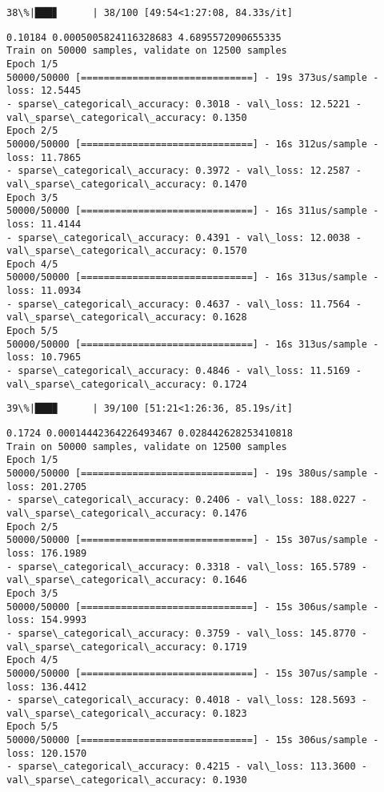 \documentclass[11pt]{article}
\begin{document}
    \begin{Verbatim}[commandchars=\\\{\}]
 38\%|███▊      | 38/100 [49:54<1:27:08, 84.33s/it]
    \end{Verbatim}

    \begin{Verbatim}[commandchars=\\\{\}]
0.10184 0.0005005824116328683 4.6895572090655335
Train on 50000 samples, validate on 12500 samples
Epoch 1/5
50000/50000 [==============================] - 19s 373us/sample - loss: 12.5445
- sparse\_categorical\_accuracy: 0.3018 - val\_loss: 12.5221 -
val\_sparse\_categorical\_accuracy: 0.1350
Epoch 2/5
50000/50000 [==============================] - 16s 312us/sample - loss: 11.7865
- sparse\_categorical\_accuracy: 0.3972 - val\_loss: 12.2587 -
val\_sparse\_categorical\_accuracy: 0.1470
Epoch 3/5
50000/50000 [==============================] - 16s 311us/sample - loss: 11.4144
- sparse\_categorical\_accuracy: 0.4391 - val\_loss: 12.0038 -
val\_sparse\_categorical\_accuracy: 0.1570
Epoch 4/5
50000/50000 [==============================] - 16s 313us/sample - loss: 11.0934
- sparse\_categorical\_accuracy: 0.4637 - val\_loss: 11.7564 -
val\_sparse\_categorical\_accuracy: 0.1628
Epoch 5/5
50000/50000 [==============================] - 16s 313us/sample - loss: 10.7965
- sparse\_categorical\_accuracy: 0.4846 - val\_loss: 11.5169 -
val\_sparse\_categorical\_accuracy: 0.1724
    \end{Verbatim}

    \begin{Verbatim}[commandchars=\\\{\}]
 39\%|███▉      | 39/100 [51:21<1:26:36, 85.19s/it]
    \end{Verbatim}

    \begin{Verbatim}[commandchars=\\\{\}]
0.1724 0.00014442364226493467 0.028442628253410818
Train on 50000 samples, validate on 12500 samples
Epoch 1/5
50000/50000 [==============================] - 19s 380us/sample - loss: 201.2705
- sparse\_categorical\_accuracy: 0.2406 - val\_loss: 188.0227 -
val\_sparse\_categorical\_accuracy: 0.1476
Epoch 2/5
50000/50000 [==============================] - 15s 307us/sample - loss: 176.1989
- sparse\_categorical\_accuracy: 0.3318 - val\_loss: 165.5789 -
val\_sparse\_categorical\_accuracy: 0.1646
Epoch 3/5
50000/50000 [==============================] - 15s 306us/sample - loss: 154.9993
- sparse\_categorical\_accuracy: 0.3759 - val\_loss: 145.8770 -
val\_sparse\_categorical\_accuracy: 0.1719
Epoch 4/5
50000/50000 [==============================] - 15s 307us/sample - loss: 136.4412
- sparse\_categorical\_accuracy: 0.4018 - val\_loss: 128.5693 -
val\_sparse\_categorical\_accuracy: 0.1823
Epoch 5/5
50000/50000 [==============================] - 15s 306us/sample - loss: 120.1570
- sparse\_categorical\_accuracy: 0.4215 - val\_loss: 113.3600 -
val\_sparse\_categorical\_accuracy: 0.1930
    \end{Verbatim}
\end{document}
